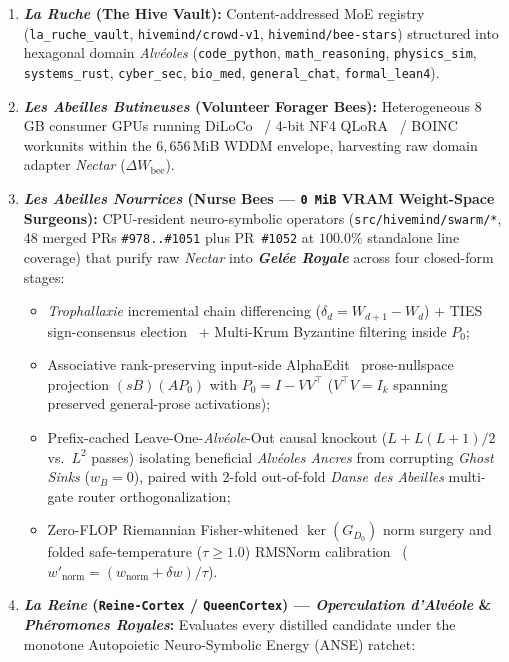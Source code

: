 \documentclass[11pt,a4paper]{article}
\begin{document}
\begin{enumerate}[leftmargin=1.8em]
    \item \textbf{\emph{La Ruche} (The Hive Vault):} Content-addressed MoE registry (\texttt{la\_ruche\_vault}, \texttt{hivemind/crowd-v1}, \texttt{hivemind/bee-stars}) structured into hexagonal domain \emph{Alv\'eoles} (\texttt{code\_python}, \texttt{math\_reasoning}, \texttt{physics\_sim}, \texttt{systems\_rust}, \texttt{cyber\_sec}, \texttt{bio\_med}, \texttt{general\_chat}, \texttt{formal\_lean4}).
    \item \textbf{\emph{Les Abeilles Butineuses} (Volunteer Forager Bees):} Heterogeneous 8\,GB consumer GPUs running DiLoCo~\cite{douillard2023diloco} / 4-bit NF4 QLoRA~\cite{dettmers2023qlora,hu2021lora} / BOINC workunits within the $6{,}656$\,MiB WDDM envelope, harvesting raw domain adapter \emph{Nectar} ($\Delta W_{\mathrm{bee}}$).
    \item \textbf{\emph{Les Abeilles Nourrices} (Nurse Bees --- \texttt{0\,MiB} VRAM Weight-Space Surgeons):} CPU-resident neuro-symbolic operators (\texttt{src/hivemind/swarm/*}, 48 merged PRs \texttt{\#978..\#1051} plus PR~\texttt{\#1052} at $100.0\%$ standalone line coverage) that purify raw \emph{Nectar} into \textbf{\emph{Gel\'ee Royale}} across four closed-form stages:
    \begin{itemize}[leftmargin=1.4em]
        \item \emph{Trophallaxie} incremental chain differencing ($\delta_d = W_{d+1} - W_d$) + TIES sign-consensus election~\cite{yadav2023ties,yu2023dare} + Multi-Krum Byzantine filtering inside $P_0$;
        \item Associative rank-preserving input-side AlphaEdit~\cite{fang2024alphaedit,meng2022memit} prose-nullspace projection $(sB)(AP_0)$ with $P_0 = I - V V^\top$ ($V^\top V = I_k$ spanning preserved general-prose activations);
        \item Prefix-cached Leave-One-\emph{Alv\'eole}-Out causal knockout ($L + L(L+1)/2$ vs.\ $L^2$ passes) isolating beneficial \emph{Alv\'eoles Ancres} from corrupting \emph{Ghost Sinks} ($w_B = 0$), paired with 2-fold out-of-fold \emph{Danse des Abeilles} multi-gate router orthogonalization;
        \item Zero-FLOP Riemannian Fisher-whitened $\ker(G_{D_0})$ norm surgery and folded safe-temperature ($\tau \ge 1.0$) RMSNorm calibration~\cite{guo2017calibration} ($w'_{\mathrm{norm}} = (w_{\mathrm{norm}} + \delta w)/\tau$).
    \end{itemize}
    \item \textbf{\emph{La Reine} (\texttt{Reine-Cortex} / \texttt{QueenCortex}) --- \emph{Operculation d'Alv\'eole} \& \emph{Ph\'eromones Royales}:} Evaluates every distilled candidate under the monotone Autopoietic Neuro-Symbolic Energy (ANSE) ratchet:

\end{enumerate}
\end{document}
